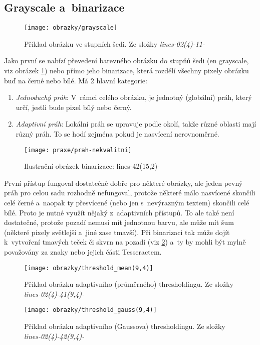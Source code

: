 \documentclass[12pt,oneside]{report}			%
\begin{document}
	\subsection{Grayscale a~binarizace}
	\begin{figure}[h!]
	\texttt{[image: obrazky/grayscale]}
	\centering
	\caption{Příklad obrázku ve stupních šedi. Ze složky \emph{lines-02(4)-11-}}
	\label{fig:grayscale}
	\end{figure}
	 Jako první se nabízí převedení barevného obrázku do stupňů šedi (\gls{en} grayscale, \gls{viz} obrázek \ref{fig:grayscale}) nebo přímo jeho binarizace, která rozdělí všechny pixely obrázku buď na černé nebo bílé. Má 2 hlavní kategorie:
	 \begin{enumerate}
	 \item{\emph{Jednoduchý práh}: V~rámci celého obrázku, je jednotný (globální) práh, který určí, jestli bude pixel bílý nebo černý.}
	 \item{\emph{Adaptivní práh}:  Lokální práh se upravuje podle okolí, takže různé oblasti mají různý práh. To se hodí zejména pokud je nasvícení nerovnoměrné.}
	  \end{enumerate}
	  \begin{figure}[h!]
	 \texttt{[image: praxe/prah-nekvalitni]}
	\centering
	\caption{Ilustrační obrázek binarizace: lines-42(15,2)-}
	\label{fig:binarizace}
	\end{figure}
	 První přístup fungoval dostatečně dobře pro některé obrázky, ale jeden pevný práh pro celou sadu rozhodně nefungoval, protože některé málo nasvícené skončili celé černé a~naopak ty přesvícené (nebo jen s~nevýrazným textem) skončili celé bílé. Proto je nutné využít nějaký z~adaptivních přístupů. To ale také není dostatečné, protože pozadí nemusí mít jednotnou barvu, ale může mít šum (některé pixely světlejší a~jiné zase tmavší). Při binarizaci tak může dojít k~vytvoření tmavých teček či skvrn na pozadí (\gls{viz} \ref{fig:binarizace}) a~ty by mohli být mylně považovány za znaky nebo jejich části Tesseractem.
	
	\begin{figure}[h]
	\texttt{[image: obrazky/threshold\_mean(9,4)]}
	\centering
	\caption{Příklad obrázku adaptivního (průměrného) thresholdingu. Ze složky \emph{lines-02(4)-41(9,4)-}}
	\label{fig:mean94}
	\end{figure}
	
	\begin{figure}[h]
	\texttt{[image: obrazky/threshold\_gauss(9,4)]}
	\centering
	\caption{Příklad obrázku adaptivního (Gaussova) thresholdingu. Ze složky \emph{lines-02(4)-42(9,4)-}}
	\label{fig:gauss94}
	\end{figure}
	
\end{document}
